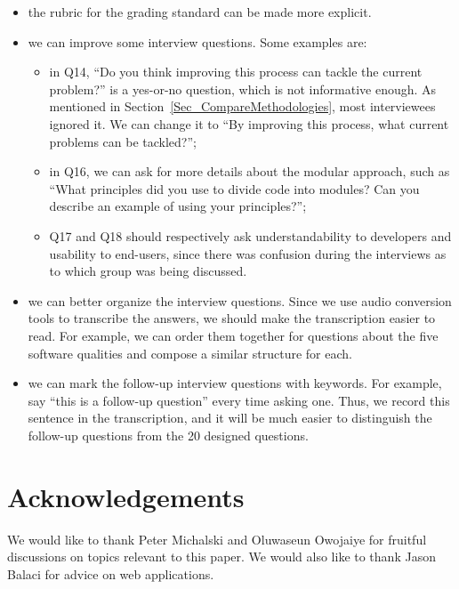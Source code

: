 \documentclass[final, 3p, times, authoryear]{elsarticle}
\begin{document}
\begin{itemize}
	\item the rubric for the grading standard can be made more explicit.
	\item we can improve some interview questions. Some examples are:
	\begin{itemize}
	    \item in {Q14}, ``Do you think improving this process can tackle the
	    current problem?'' is a yes-or-no question, which is not informative
	    enough. As mentioned in Section~\ref{Sec_CompareMethodologies}, most
	    interviewees ignored it. We can change it to ``By improving this
	    process, what current problems can be tackled?''; 
	    \item in {Q16}, we can ask for more details about the modular
	    approach, such as ``What principles did you use to divide code into
	    modules? Can you describe an example of using your principles?'';
	    \item {Q17} and {Q18} should respectively ask understandability to
	    developers and usability to end-users, since there was confusion during
	    the interviews as to which group was being discussed.
	\end{itemize}
	\item we can better organize the interview questions. Since we use audio
	conversion tools to transcribe the answers, we should make the transcription
	easier to read. For example, we can order them together for questions about
	the five software qualities and compose a similar structure for each.
	\item we can mark the follow-up interview questions with keywords. For
	example, say ``this is a follow-up question'' every time asking one. Thus, we
	record this sentence in the transcription, and it will be much easier to
	distinguish the follow-up questions from the 20 designed questions.
\end{itemize}

\section*{Acknowledgements}

We would like to thank Peter Michalski and Oluwaseun Owojaiye for fruitful
discussions on topics relevant to this paper.  We would also like to thank Jason
Balaci for advice on web applications.

\end{document}
